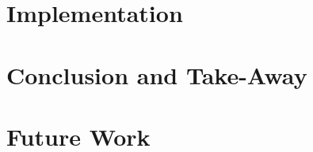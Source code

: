 \documentclass[sigconf]{acmart}
\begin{document}

\section{Implementation}

\section{Conclusion and Take-Away}

\section{Future Work}



 
\end{document}

